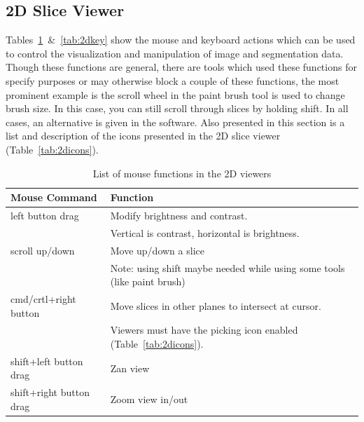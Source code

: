 \documentclass[fleqn,11pt,openany]{book}
\begin{document}
\subsection{2D Slice Viewer}

Tables~\ref{tab:2dmouse}~\&~\ref{tab:2dkey}  show the mouse and keyboard actions which can be used to control the visualization and manipulation of image and segmentation data.  Though these functions are general, there are tools which used these functions for specify purposes or may otherwise block a couple of these functions, the most prominent example is the scroll wheel in the paint brush tool is used to change brush size.  In this case, you can still scroll through slices by holding shift.  In all cases, an alternative is given in the software.  Also presented in this section is a list and description of the icons presented in the 2D slice viewer (Table~\ref{tab:2dicons}).

\begin{table}[h!]
\label{tab:2dmouse}
\caption{List of mouse functions in the 2D viewers}
\begin{tabular}{|l|l|}
\hline
{\bf Mouse Command} & {\bf Function}\\
\hline
left button drag & Modify brightness and contrast.  \\ &Vertical is contrast, horizontal is brightness. \\
\hline 
scroll up/down & Move up/down a slice\\ &Note: using shift maybe needed while using some tools (like paint brush)\\
\hline
cmd/crtl+right button & Move slices in other planes to intersect at cursor.\\  &Viewers must have the picking icon enabled (Table~\ref{tab:2dicons}).\\
\hline
shift+left button drag & Zan view\\
shift+right button drag & Zoom view in/out\\
\hline
\end{tabular}
\end{table}
\end{document}
